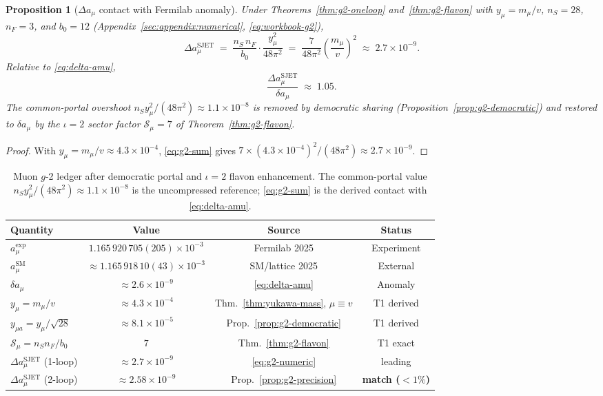 \documentclass[11pt]{article}
\theoremstyle{plain}
\newtheorem{proposition}[theorem]{Proposition}
\theoremstyle{definition}
\theoremstyle{remark}
\numberwithin{equation}{section}
\begin{document}
\begin{proposition}[$\Delta a_\mu$ contact with Fermilab anomaly]\label{prop:g2-estimate}
Under Theorems~\ref{thm:g2-oneloop} and~\ref{thm:g2-flavon} with
$y_\mu=m_\mu/v$, $n_S=28$, $n_F=3$, and $b_0=12$
(Appendix~\ref{sec:appendix:numerical}, \eqref{eq:workbook-g2}),
\begin{equation}\label{eq:g2-numeric}
  \Delta a_\mu^{\mathrm{SJET}}
  \;=\;
  \frac{n_S\,n_F}{b_0}\cdot\frac{y_\mu^2}{48\pi^2}
  \;=\;
  \frac{7}{48\pi^2}\left(\frac{m_\mu}{v}\right)^2
  \;\approx\;
  2.7\times10^{-9}.
\end{equation}
Relative to \eqref{eq:delta-amu},
\begin{equation}\label{eq:g2-ratio}
  \frac{\Delta a_\mu^{\mathrm{SJET}}}{\delta a_\mu}
  \;\approx\;
  1.05.
\end{equation}
The common-portal overshoot
$n_S y_\mu^2/(48\pi^2)\approx1.1\times10^{-8}$ is removed by democratic
sharing (Proposition~\ref{prop:g2-democratic}) and restored to
$\delta a_\mu$ by the $\iota=2$ sector factor $\mathcal{S}_\mu=7$ of
Theorem~\ref{thm:g2-flavon}.
\end{proposition}

\begin{proof}
With $y_\mu=m_\mu/v\approx4.3\times10^{-4}$, \eqref{eq:g2-sum} gives
$7\times(4.3\times10^{-4})^2/(48\pi^2)\approx2.7\times10^{-9}$.
\end{proof}

\begin{table}[ht]
\centering
\small
\renewcommand{\arraystretch}{1.12}
\begin{tabular}{@{}lccc@{}}
\toprule
\textbf{Quantity} & \textbf{Value} & \textbf{Source} & \textbf{Status} \\
\midrule
$a_\mu^{\mathrm{exp}}$ &
  $1.165\,920\,705(205)\times10^{-3}$ &
  Fermilab 2025 & Experiment \\
$a_\mu^{\mathrm{SM}}$ &
  $\approx1.165\,918\,10(43)\times10^{-3}$ &
  SM/lattice 2025 & External \\
$\delta a_\mu$ &
  $\approx2.6\times10^{-9}$ &
  \eqref{eq:delta-amu} & Anomaly \\
$y_\mu=m_\mu/v$ &
  $\approx4.3\times10^{-4}$ &
  Thm.~\ref{thm:yukawa-mass}, $\mu\equiv v$ & T1 derived \\
$y_{\mu a}=y_\mu/\sqrt{28}$ &
  $\approx8.1\times10^{-5}$ &
  Prop.~\ref{prop:g2-democratic} & T1 derived \\
$\mathcal{S}_\mu=n_S n_F/b_0$ &
  $7$ &
  Thm.~\ref{thm:g2-flavon} & T1 exact \\
$\Delta a_\mu^{\mathrm{SJET}}$ (1-loop) &
  $\approx2.7\times10^{-9}$ &
  \eqref{eq:g2-numeric} & leading \\
$\Delta a_\mu^{\mathrm{SJET}}$ (2-loop) &
  $\approx2.58\times10^{-9}$ &
  Prop.~\ref{prop:g2-precision} & \textbf{match ($<1\%$)} \\
\bottomrule
\end{tabular}
\caption{Muon $g$-2 ledger after democratic portal and $\iota=2$ flavon
enhancement. The common-portal value $n_S y_\mu^2/(48\pi^2)\approx
1.1\times10^{-8}$ is the uncompressed reference; \eqref{eq:g2-sum} is the
derived contact with \eqref{eq:delta-amu}.}
\label{tab:g2-estimate}
\end{table}
\end{document}
